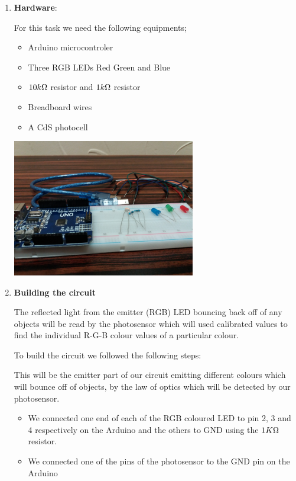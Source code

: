 \documentclass[12pt,a4paper]{report}
\begin{document}
\begin{enumerate}
\item \textbf{Hardware}:

For this task we need the following equipments;
\begin{itemize}
\item Arduino microcontroler
\item Three RGB LEDs  Red Green and Blue 
\item $10k \ohm$ resistor and $1k \ohm$ resistor
\item Breadboard wires
\item A CdS photocell   
\end{itemize}

\begin{center}
\includegraphics[width=8cm]{Capture1.jpg}
\end{center}

\item \textbf{Building the circuit} 

The reflected light from the emitter (RGB) LED bouncing back off of any objects will be read by the photosensor which will used calibrated values to find the individual R-G-B colour values of a particular colour.

To build the circuit we followed the following steps:

This will be the emitter part of our circuit emitting different colours which will bounce off of objects, by the law of optics which will be detected by our photosensor.

\begin{itemize}

\item We connected one end of each of the RGB coloured LED to pin 2, 3 and 4 respectively on the Arduino and the others to GND using the $1K\ohm$ resistor.

\item We connected one of the pins of the photosensor to the GND pin on the Arduino


\end{itemize}
\end{enumerate}
\end{document}
